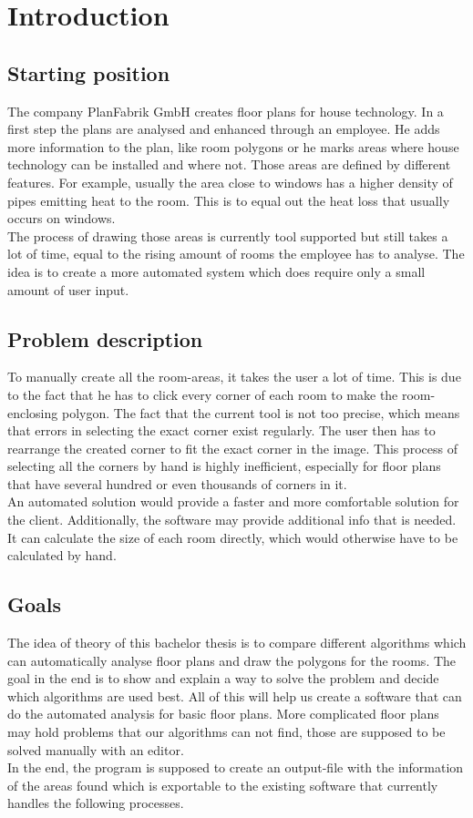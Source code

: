 \section{Introduction}
\subsection{Starting position}
The company PlanFabrik GmbH creates floor plans for house technology. In a first
step the plans are analysed and enhanced through an employee. He adds more
information to the plan, like room polygons or he marks areas where house technology
can be installed and where not. Those areas are defined by different features. For example, usually the area close to windows has a higher density of pipes emitting heat to the room. This is to equal out the heat loss that usually occurs on windows.
\\
The process of drawing those areas is currently tool supported but still takes a lot of time, equal to the rising amount of rooms the employee has to analyse. The idea is to create a more automated system which does require only a small amount of user input.

\subsection{Problem description}
To manually create all the room-areas, it takes the user a lot of time. This is due to the fact that he has to click every corner of each room to make the room-enclosing polygon. The fact that the current tool is not too precise, which means that errors in selecting the exact corner exist regularly. The user then has to rearrange the created corner to fit the exact corner in the image. This process of selecting all the corners by hand is highly inefficient, especially for floor plans that have several hundred or even thousands of corners in it.
\\
An automated solution would provide a faster and more comfortable solution for the client. Additionally, the software may provide additional info that is needed. It can calculate the size of each room directly, which would otherwise have to be calculated by hand.

\subsection{Goals}
The idea of theory of this bachelor thesis is to compare different algorithms which can automatically analyse floor plans and draw the polygons for the rooms. The goal in the end is to show and explain a way to solve the problem and decide which algorithms are used best. All of this will help us create a software that can do the automated analysis for basic floor plans. More complicated floor plans may hold problems that our algorithms can not find, those are supposed to be solved manually with an editor.
\\
In the end, the program is supposed to create an output-file with the information of the areas found which is exportable to the existing software that currently handles the following processes.


